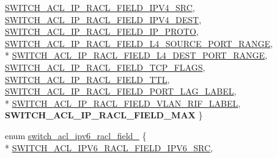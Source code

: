 \begin{DoxyCompactItemize}
\hyperlink{group__ACL_ggaf0f1f49088b56fbe530ae19b8db6b4fba84c99feb802a30ca9083c344840938e6}{S\+W\+I\+T\+C\+H\+\_\+\+A\+C\+L\+\_\+\+I\+P\+\_\+\+R\+A\+C\+L\+\_\+\+F\+I\+E\+L\+D\+\_\+\+I\+P\+V4\+\_\+\+S\+R\+C}, 
\hyperlink{group__ACL_ggaf0f1f49088b56fbe530ae19b8db6b4fba8d28ad60e504445bffcdff8cfab6ed17}{S\+W\+I\+T\+C\+H\+\_\+\+A\+C\+L\+\_\+\+I\+P\+\_\+\+R\+A\+C\+L\+\_\+\+F\+I\+E\+L\+D\+\_\+\+I\+P\+V4\+\_\+\+D\+E\+S\+T}, 
\hyperlink{group__ACL_ggaf0f1f49088b56fbe530ae19b8db6b4fbaac3eaba76a0b6d202aa2a53527239079}{S\+W\+I\+T\+C\+H\+\_\+\+A\+C\+L\+\_\+\+I\+P\+\_\+\+R\+A\+C\+L\+\_\+\+F\+I\+E\+L\+D\+\_\+\+I\+P\+\_\+\+P\+R\+O\+T\+O}, 
\hyperlink{group__ACL_ggaf0f1f49088b56fbe530ae19b8db6b4fbafacd016d9676ee44538acd20f338f44a}{S\+W\+I\+T\+C\+H\+\_\+\+A\+C\+L\+\_\+\+I\+P\+\_\+\+R\+A\+C\+L\+\_\+\+F\+I\+E\+L\+D\+\_\+\+L4\+\_\+\+S\+O\+U\+R\+C\+E\+\_\+\+P\+O\+R\+T\+\_\+\+R\+A\+N\+G\+E}, 
\\*
\hyperlink{group__ACL_ggaf0f1f49088b56fbe530ae19b8db6b4fba8b9da8148996da5051c7d60699187f1b}{S\+W\+I\+T\+C\+H\+\_\+\+A\+C\+L\+\_\+\+I\+P\+\_\+\+R\+A\+C\+L\+\_\+\+F\+I\+E\+L\+D\+\_\+\+L4\+\_\+\+D\+E\+S\+T\+\_\+\+P\+O\+R\+T\+\_\+\+R\+A\+N\+G\+E}, 
\hyperlink{group__ACL_ggaf0f1f49088b56fbe530ae19b8db6b4fba7f7c8138c206f577ffaf5b99cb61b0f3}{S\+W\+I\+T\+C\+H\+\_\+\+A\+C\+L\+\_\+\+I\+P\+\_\+\+R\+A\+C\+L\+\_\+\+F\+I\+E\+L\+D\+\_\+\+T\+C\+P\+\_\+\+F\+L\+A\+G\+S}, 
\hyperlink{group__ACL_ggaf0f1f49088b56fbe530ae19b8db6b4fbaa5d34b09f89e14b4da4444ad7b75fb9a}{S\+W\+I\+T\+C\+H\+\_\+\+A\+C\+L\+\_\+\+I\+P\+\_\+\+R\+A\+C\+L\+\_\+\+F\+I\+E\+L\+D\+\_\+\+T\+T\+L}, 
\hyperlink{group__ACL_ggaf0f1f49088b56fbe530ae19b8db6b4fba59011a04f303fc355970d3787772bdcf}{S\+W\+I\+T\+C\+H\+\_\+\+A\+C\+L\+\_\+\+I\+P\+\_\+\+R\+A\+C\+L\+\_\+\+F\+I\+E\+L\+D\+\_\+\+P\+O\+R\+T\+\_\+\+L\+A\+G\+\_\+\+L\+A\+B\+E\+L}, 
\\*
\hyperlink{group__ACL_ggaf0f1f49088b56fbe530ae19b8db6b4fba489b53e7691eb61bdf56c7a4a50143da}{S\+W\+I\+T\+C\+H\+\_\+\+A\+C\+L\+\_\+\+I\+P\+\_\+\+R\+A\+C\+L\+\_\+\+F\+I\+E\+L\+D\+\_\+\+V\+L\+A\+N\+\_\+\+R\+I\+F\+\_\+\+L\+A\+B\+E\+L}, 
{\bfseries S\+W\+I\+T\+C\+H\+\_\+\+A\+C\+L\+\_\+\+I\+P\+\_\+\+R\+A\+C\+L\+\_\+\+F\+I\+E\+L\+D\+\_\+\+M\+A\+X}
 \}
\item 
enum \hyperlink{group__ACL_gabaf09e557bd1549a5197e9d4c77d4f8c}{switch\+\_\+acl\+\_\+ipv6\+\_\+racl\+\_\+field\+\_\+} \{ \\*
\hyperlink{group__ACL_ggabaf09e557bd1549a5197e9d4c77d4f8ca170d575e2718bb137b0cd74057e7f60b}{S\+W\+I\+T\+C\+H\+\_\+\+A\+C\+L\+\_\+\+I\+P\+V6\+\_\+\+R\+A\+C\+L\+\_\+\+F\+I\+E\+L\+D\+\_\+\+I\+P\+V6\+\_\+\+S\+R\+C}, 

\end{DoxyCompactItemize}
